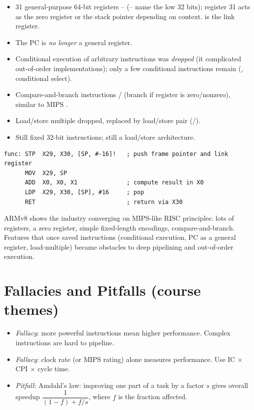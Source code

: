 \begin{itemize}
  \item 31 general-purpose 64-bit registers --
    (-- name the low 32 bits); register 31 acts as the
    zero register  or the stack pointer  depending on
    context.  is the link register.
  \item The PC is \emph{no longer} a general register.
  \item Conditional execution of arbitrary instructions was \emph{dropped}
    (it complicated out-of-order implementations); only a few conditional
    instructions remain (, conditional select).
  \item Compare-and-branch instructions / (branch if
    register is zero/nonzero), similar to MIPS .
  \item Load/store multiple dropped, replaced by load/store pair
    (/).
  \item Still fixed 32-bit instructions; still a load/store architecture.
\end{itemize}

\begin{example}
\begin{lstlisting}[style=arm]
func: STP  X29, X30, [SP, #-16]!   ; push frame pointer and link register
      MOV  X29, SP
      ADD  X0, X0, X1              ; compute result in X0
      LDP  X29, X30, [SP], #16     ; pop
      RET                          ; return via X30
\end{lstlisting}
\end{example}

\begin{important}
ARMv8 shows the industry converging on MIPS-like RISC principles: lots of
registers, a zero register, simple fixed-length encodings, compare-and-branch.
Features that once saved instructions (conditional execution, PC as a
general register, load-multiple) became obstacles to deep pipelining and
out-of-order execution.
\end{important}

\section{Fallacies and Pitfalls (course themes)}

\begin{itemize}
  \item \emph{Fallacy}: more powerful instructions mean higher performance.
    Complex instructions are hard to pipeline.
  \item \emph{Fallacy}: clock rate (or MIPS rating) alone measures
    performance. Use IC $\times$ CPI $\times$ cycle time.
  \item \emph{Pitfall}: Amdahl's law: improving one part of a task by a
    factor $s$ gives overall speedup
    $\dfrac{1}{(1 - f) + f/s}$, where $f$ is the fraction affected.
\end{itemize}

